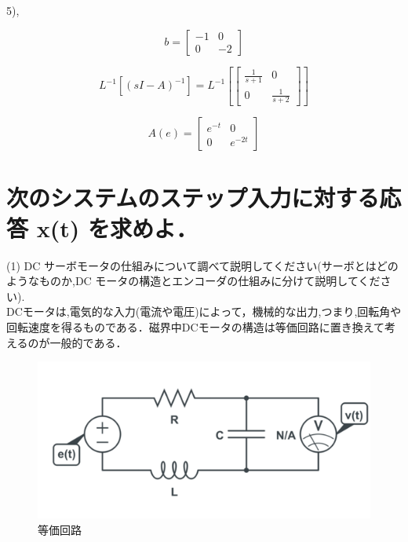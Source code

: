 \documentclass[twocolumn,xelatex,ja=standard,jafont=noto]{bxjsarticle}
\begin{document}
	
	5),
	
		\begin{equation}
	    b={
\left[ \begin{array}{cc}
-1&0\\
0&-2
\end{array}
\right ]}
	\end{equation}
	
	
	\begin{equation}
L^{-1}[(sI-A)^{-1}]=L^{-1}[
	    {
\left[ \begin{array}{cc}
\frac{1}{s+1}&0\\
0&\frac{1}{s+2}
\end{array}
\right ]}
	]
\end{equation}

\begin{equation}
	    A(e)={
\left[ \begin{array}{cc}
e^{-t}&0\\
0&e^{-2t}
\end{array}
\right ]}
	\end{equation}
	
	
\section{次のシステムのステップ入力に対する応答 x(t) を求めよ．}

	

(1) DC サーボモータの仕組みについて調べて説明してください(サーボとはどのようなものか,DC モータの構造とエンコーダの仕組みに分けて説明してください).\\

DCモータは,電気的な入力(電流や電圧)によって，機械的な出力,つまり,回転角や回転速度を得るものである．磁界中DCモータの構造は等価回路に置き換えて考えるのが一般的である．

\begin{figure}[h!]
    \centering
    \includegraphics[scale=0.4]{011.png}
    \caption{等価回路 }
\end{figure}
\end{document}
